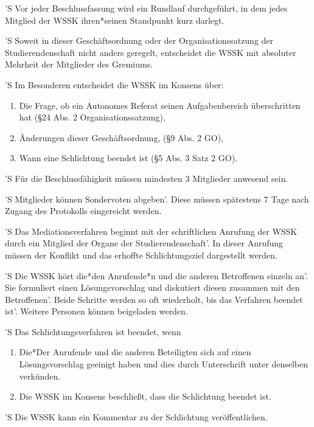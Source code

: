 \documentclass[fontsize=12pt,parskip=half]{scrartcl}
\begin{document}
\begin{contract}
  'S Vor jeder Beschlussfassung wird ein Rundlauf durchgeführt, in dem jedes
  Mitglied der WSSK ihren*seinen Standpunkt kurz darlegt.

  'S Soweit in dieser Geschäftsordnung oder der Organisationssatzung der
  Studierendenschaft nicht anders geregelt, entscheidet die WSSK mit absoluter
  Mehrheit der Mitglieder des Gremiums.

  'S Im Besonderen entscheidet die WSSK im Konsens über:
  \begin{enumerate}
    \item Die Frage, ob ein Autonomes Referat seinen Aufgabenbereich
      überschritten hat (§24 Abs. 2 Organisationssatzung),
    \item Änderungen dieser Geschäftsordnung, (§9 Abs. 2 GO),
    \item Wann eine Schlichtung beendet ist (§5 Abs. 3 Satz 2 GO).
  \end{enumerate}

  'S Für die Beschlussfähigkeit müssen mindesten 3 Mitglieder anwesend sein.

  'S Mitglieder können Sondervoten abgeben'. Diese müssen spätestens 7 Tage nach
  Zugang des Protokolls eingereicht werden.

  'S Das Mediationsverfahren beginnt mit der schriftlichen Anrufung der WSSK
  durch ein Mitglied der Organe der Studierendenschaft'. In dieser Anrufung
  müssen der Konflikt und das erhoffte Schlichtungsziel dargestellt werden.

  'S Die WSSK hört die*den Anrufende*n und die anderen Betroffenen einzeln an'.
  Sie formuliert einen Lösungsvorschlag und diskutiert diesen zusammen mit den
  Betroffenen'. Beide Schritte werden so oft wiederholt, bis das Verfahren
  beendet ist'. Weitere Personen können beigeladen werden.

  'S Das Schlichtungsverfahren ist beendet, wenn
  \begin{enumerate}
    \item Die*Der Anrufende und die anderen Beteiligten sich auf einen
      Lösungsvorschlag geeinigt haben und dies durch Unterschrift unter
      denselben verkünden.
    \item Die WSSK im Konsens beschließt, dass die Schlichtung beendet ist.
  \end{enumerate}

  'S Die WSSK kann ein Kommentar zu der Schlichtung veröffentlichen.


\end{contract}
\end{document}
